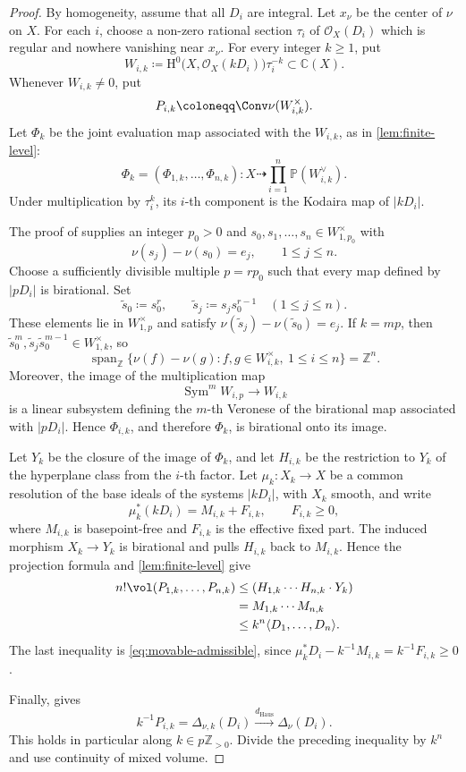 \documentclass[11pt,a4paper]{amsart}
\newcommand{\dHaus}{d_{\mathrm{Haus}}}
\begin{document}
\begin{proof}
By homogeneity, assume that all $D_i$ are integral.  Let $x_\nu$ be the center of $\nu$ on $X$.  For each $i$, choose a non-zero rational section $\tau_i$ of $\mathcal O_X(D_i)$ which is regular and nowhere vanishing near $x_\nu$.
For every integer $k\geq1$, put
\[
 W_{i,k}\coloneqq \mathrm{H}^0\bigl(X,\mathcal O_X(kD_i)\bigr)\tau_i^{-k}
 \subset\mathbb C(X).
\]
Whenever $W_{i,k}\neq0$, put
\[
 P_{i,k}\coloneqq \Conv\nu(W_{i,k}^\times).
\]
Let $\Phi_k$ be the joint evaluation map associated with the $W_{i,k}$, as in \cref{lem:finite-level}:
\[
 \Phi_k=(\Phi_{1,k},\ldots,\Phi_{n,k})\colon X\dashrightarrow\prod_{i=1}^n\mathbb P(W_{i,k}^\vee).
\]
Under multiplication by $\tau_i^k$, its $i$-th component is the Kodaira map of $|kD_i|$.

The proof of \cite[Proposition~10.3.1]{Xiabook} supplies an integer $p_0>0$ and $s_0,s_1,\ldots,s_n\in W_{1,p_0}^\times$ with
\[
 \nu(s_j)-\nu(s_0)=e_j,\qquad 1\leq j\leq n.
\]
Choose a sufficiently divisible multiple $p=rp_0$ such that every map defined by $|pD_i|$ is birational.  Set
\[
 \widetilde s_0\coloneqq s_0^r,\qquad \widetilde s_j\coloneqq s_js_0^{r-1}\quad(1\leq j\leq n).
\]
These elements lie in $W_{1,p}^\times$ and satisfy $\nu(\widetilde s_j)-\nu(\widetilde s_0)=e_j$.  If $k=mp$, then
$\widetilde s_0^m,\widetilde s_j\widetilde s_0^{m-1}\in W_{1,k}^\times$, so
\[
 \operatorname{span}_{\mathbb Z}
 \{\nu(f)-\nu(g):f,g\in W_{i,k}^\times,\ 1\leq i\leq n\}
 =\mathbb Z^n.
\]
Moreover, the image of the multiplication map
\[
 \operatorname{Sym}^mW_{i,p}\longrightarrow W_{i,k}
\]
is a linear subsystem defining the $m$-th Veronese of the birational map associated with $|pD_i|$.  Hence $\Phi_{i,k}$, and therefore $\Phi_k$, is birational onto its image.

Let $Y_k$ be the closure of the image of $\Phi_k$, and let $H_{i,k}$ be the
restriction to $Y_k$ of the hyperplane class from the $i$-th factor.  Let
$\mu_k\colon X_k\to X$ be a common resolution of the base ideals of the
systems $|kD_i|$, with $X_k$ smooth, and write
\[
 \mu_k^*(kD_i)=M_{i,k}+F_{i,k},
 \qquad F_{i,k}\geq0,
\]
where $M_{i,k}$ is basepoint-free and $F_{i,k}$ is the effective fixed part.
The induced morphism $X_k\to Y_k$ is birational and pulls $H_{i,k}$ back to
$M_{i,k}$.  Hence the projection formula and
\cref{lem:finite-level} give
\begin{align*}
 n!\vol(P_{1,k},\ldots,P_{n,k})
 &\leq(H_{1,k}\cdots H_{n,k}\cdot Y_k)\\
 &=M_{1,k}\cdots M_{n,k}\\
 &\leq k^n\langle D_1,\ldots,D_n\rangle.
\end{align*}
The last inequality is \eqref{eq:movable-admissible}, since
$\mu_k^*D_i-k^{-1}M_{i,k}=k^{-1}F_{i,k}\geq0$.

Finally, \cite[Proposition~10.3.4]{Xiabook} gives
\[
 k^{-1}P_{i,k}=\Delta_{\nu,k}(D_i)
 \xrightarrow{\dHaus}\Delta_\nu(D_i).
\]
This holds in particular along $k\in p\mathbb Z_{>0}$.  Divide the preceding
inequality by $k^n$ and use continuity of mixed volume.
\end{proof}
\end{document}
